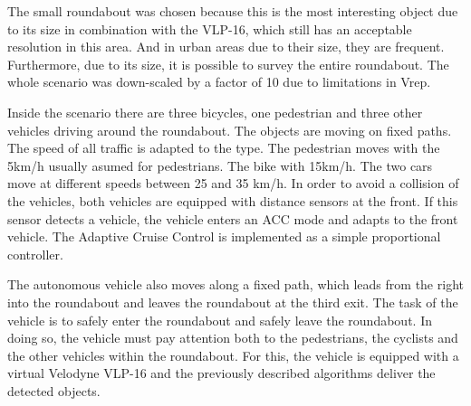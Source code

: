 \documentclass[11pt,oneside,openright]{mpreport}
\begin{document}
The small roundabout was chosen because this is the most interesting object due to its size in combination with the VLP-16, which still has an acceptable resolution in this area.
And in urban areas due to their size, they are frequent. Furthermore, due to its size, it is possible to survey the entire roundabout. The whole scenario was down-scaled by a factor of 10 due to limitations in Vrep.


Inside the scenario there are three bicycles, one pedestrian and three other vehicles driving around the roundabout. The objects are moving on fixed paths.
The speed of all traffic is adapted to the type. The pedestrian moves with the 5km/h usually asumed for pedestrians.
The bike with 15km/h. The two cars move at different speeds between 25 and 35 km/h. In order to avoid a collision of the vehicles,
both vehicles are equipped with distance sensors at the front. If this sensor detects a vehicle, the vehicle enters an \acl{ACC} mode and adapts to the front vehicle.
The Adaptive Cruise Control is implemented as a simple proportional controller.


The autonomous vehicle also moves along a fixed path, which leads from the right into the roundabout and leaves the roundabout at the third exit. 
The task of the vehicle is to safely enter the roundabout and safely leave the roundabout. In doing so, the vehicle must pay attention both to the pedestrians,
the cyclists and the other vehicles within the roundabout. For this, the vehicle is equipped with a virtual Velodyne VLP-16 and the previously described algorithms deliver the detected objects.
\end{document}
